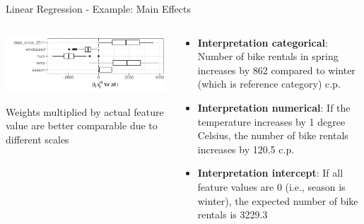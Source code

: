 \documentclass[11pt,compress,t,notes=noshow, aspectratio=169, xcolor=table]{beamer}
\begin{document}
\begin{frame}{Linear Regression - Example: Main Effects}
\begin{columns}[T, totalwidth=\linewidth]
\begin{column}{0.47\textwidth}

\includegraphics[width = \textwidth]{figure/plot_lin_effect.pdf}
  \begin{center}
    Weights multiplied by actual feature value are better comparable due to different scales
  \end{center}
%
\end{column}\hfill
\begin{column}{0.52\textwidth}  %

\begin{itemize}
    \item \textbf{Interpretation categorical}: Number of bike rentals in spring increases by 862 compared to winter (which is reference category) c.p.
    \item \textbf{Interpretation numerical}: If the temperature increases by 1 degree Celsius, the number of bike rentals increases by 120.5 c.p.
    \item \textbf{Interpretation intercept}:
    If all feature values are 0 (i.e., season is winter), the expected number of bike rentals is 3229.3
\end{itemize}
\end{column}
\end{columns}
\end{frame}
\end{document}
